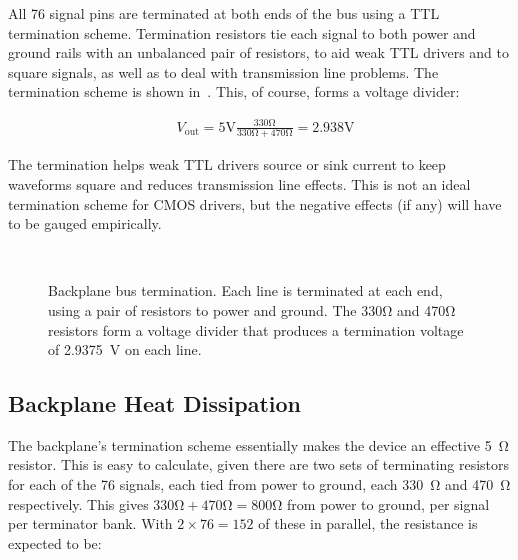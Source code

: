 All 76 signal pins are terminated at both ends of the bus using a TTL
termination scheme. Termination resistors tie each signal to both power and
ground rails with an unbalanced pair of resistors, to aid weak TTL drivers and
to square signals, as well as to deal with transmission line problems. The
termination scheme is shown in~. This, of course,
forms a voltage divider:

\begin{eqnarray}
& V_{\mbox{out}} =  5\mbox{V} \frac{\displaystyle330\mbox{Ω}}{\displaystyle 330\mbox{Ω} + 470\mbox{Ω}} = 2.938\mbox{V}\nonumber
\end{eqnarray}

The termination helps weak TTL drivers source or sink current to keep waveforms
square and reduces transmission line effects. This is not an ideal termination
scheme for CMOS drivers, but the negative effects (if any) will have to be
gauged empirically.

\begin{figure*}
\centering
{}\\
\caption[Backplane bus termination]{\label{fig:bus-termination}Backplane bus
  termination. Each line is terminated at each end, using a pair of resistors
  to power and ground. The 330Ω and 470Ω resistors form a voltage divider that
  produces a termination voltage of 2.9375~V on each line.}
\end{figure*}



\subsection{Backplane Heat Dissipation}

The backplane's termination scheme essentially makes the device an effective
5~Ω resistor. This is easy to calculate, given there are two sets of
terminating resistors for each of the 76 signals, each tied from power to
ground, each 330~Ω and 470~Ω respectively. This gives $330\mbox{Ω}+470\mbox{Ω}
= 800\mbox{Ω}$ from power to ground, per signal per terminator bank. With $2×76
= 152$ of these in parallel, the resistance is expected to be:

